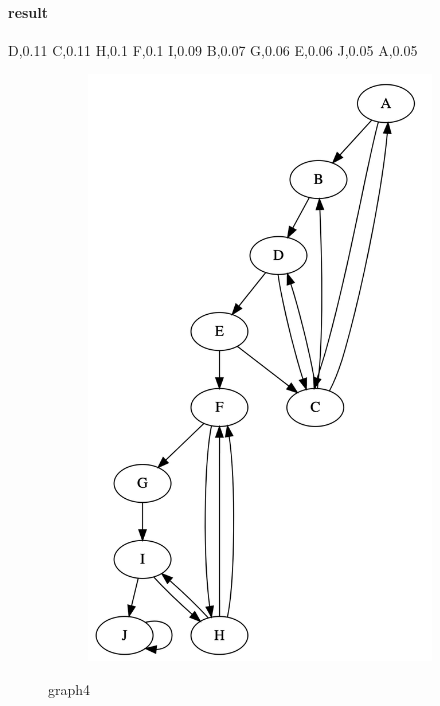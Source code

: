\documentclass{article}
\begin{document}
      \paragraph{result}

D,0.11
C,0.11
H,0.1
F,0.1
I,0.09
B,0.07
G,0.06
E,0.06
J,0.05
A,0.05
      \newpage

\begin{figure}[h!]
  \centering
  \begin{subfigure}[b]{.6\linewidth}
    \includegraphics[width=\linewidth]{graph4.jpg}
  \end{subfigure}
  \caption{graph4}

  \end{figure}
\end{document}

